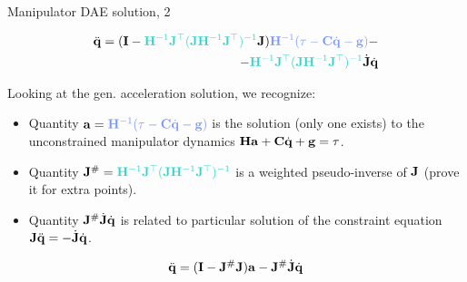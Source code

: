 \documentclass{beamer}
\begin{document}
\begin{frame}{Manipulator DAE solution, 2}
	\begin{flushleft}
		
		\textcolor{mygrey}{
		\begin{align}
			\ddot{\bo{q}}
			=
			(\bo{I}-\textcolor{myturquoise}{\bo{H}^{-1} \bo{J}\T ( \bo{J} \bo{H}^{-1} \bo{J}\T )^{-1}} \bo{J})
			 \textcolor{mylightblue}{\bo{H}^{-1}(\tau - \bo{C} \dot{\bo{q}} - \bo{g})} 
			-\\
			-
			\textcolor{myturquoise}{\bo{H}^{-1} \bo{J}\T ( \bo{J} \bo{H}^{-1} \bo{J}\T )^{-1}} \dot{\bo{J}} \dot{\bo{q}}
		\end{align}
	}
		
		Looking at the gen. acceleration solution, we recognize:
		
		\begin{itemize}
			\item Quantity $\bo{a} = \textcolor{mylightblue}{\bo{H}^{-1}(\tau - \bo{C} \dot{\bo{q}} - \bo{g})}$ is the solution (only one exists) to the unconstrained manipulator dynamics $\mathbf{H}\mathbf{a} + \mathbf{C} \dot{\mathbf{q}} + \mathbf{g} = \tau$.
			
			\item Quantity $\bo{J}^\# = \textcolor{myturquoise}{\bo{H}^{-1} \bo{J}\T ( \bo{J} \bo{H}^{-1} \bo{J}\T )^{-1}}$ is a weighted pseudo-inverse of $\mathbf{J}$ \textcolor{mygrey}{\small{(prove it for extra points)}}.
			
			\item Quantity $\mathbf{J}^\# \dot{\mathbf{J}} \dot{\mathbf{q}}$ is related to particular solution of the constraint equation $\mathbf{J} \ddot{\mathbf{q}} = - \dot{\mathbf{J}} \dot{\mathbf{q}}$.
		\end{itemize}
		
		
		\textcolor{mygrey}{
			\begin{align}
				\ddot{\mathbf{q}}
				=
				(\mathbf{I}-\mathbf{J}^\# \mathbf{J})
				\mathbf{a}
				-
				\mathbf{J}^\# \dot{\mathbf{J}} \dot{\mathbf{q}}
			\end{align}
		}
		
	\end{flushleft}
\end{frame}
\end{document}
